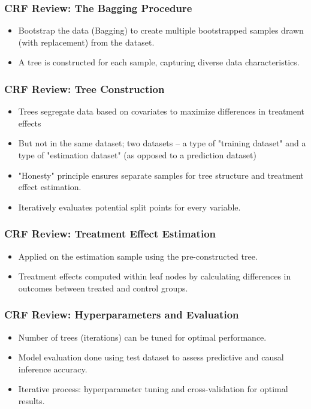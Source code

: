 \documentclass{beamer}
\begin{document}
\begin{frame}
\frametitle{CRF Review: The Bagging Procedure}
\begin{itemize}
    \item Bootstrap the data (Bagging) to create multiple bootstrapped samples drawn (with replacement) from the dataset.
    \item A tree is constructed for each sample, capturing diverse data characteristics.
\end{itemize}
\end{frame}

\begin{frame}
\frametitle{CRF Review: Tree Construction}
\begin{itemize}
    \item Trees segregate data based on covariates to maximize differences in treatment effects 
    \item But not in the same dataset; two datasets -- a type of "training dataset" and a type of "estimation dataset" (as opposed to a prediction dataset)
    \item "Honesty" principle ensures separate samples for tree structure and treatment effect estimation.
    \item Iteratively evaluates potential split points for every variable.
\end{itemize}
\end{frame}

\begin{frame}
\frametitle{CRF Review: Treatment Effect Estimation}
\begin{itemize}
    \item Applied on the estimation sample using the pre-constructed tree.
    \item Treatment effects computed within leaf nodes by calculating differences in outcomes between treated and control groups.
\end{itemize}
\end{frame}

\begin{frame}
\frametitle{CRF Review: Hyperparameters and Evaluation}
\begin{itemize}
    \item Number of trees (iterations) can be tuned for optimal performance.
    \item Model evaluation done using test dataset to assess predictive and causal inference accuracy.
    \item Iterative process: hyperparameter tuning and cross-validation for optimal results.
\end{itemize}
\end{frame}
\end{document}
